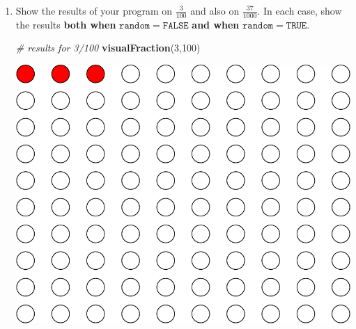 \documentclass[9pt,letter]{article}
\newenvironment{Shaded}{\begin{snugshade}}{\end{snugshade}}
\newcommand{\KeywordTok}[1]{\textcolor[rgb]{0.13,0.29,0.53}{\textbf{#1}}}
\newcommand{\DataTypeTok}[1]{\textcolor[rgb]{0.13,0.29,0.53}{#1}}
\newcommand{\DecValTok}[1]{\textcolor[rgb]{0.00,0.00,0.81}{#1}}
\newcommand{\StringTok}[1]{\textcolor[rgb]{0.31,0.60,0.02}{#1}}
\newcommand{\CommentTok}[1]{\textcolor[rgb]{0.56,0.35,0.01}{\textit{#1}}}
\newcommand{\ControlFlowTok}[1]{\textcolor[rgb]{0.13,0.29,0.53}{\textbf{#1}}}
\newcommand{\OperatorTok}[1]{\textcolor[rgb]{0.81,0.36,0.00}{\textbf{#1}}}
\newcommand{\NormalTok}[1]{#1}
\begin{document}
\begin{enumerate}
\begin{Shaded}
\end{Shaded}
\item
  Show the results of your program on \(\frac{3}{100}\) and also on
  \(\frac{37}{1000}\). In each case, show the results
  \textbf{both when } \(\mathtt{random=FALSE}\) \textbf{and when}
  \(\mathtt{random=TRUE}\).

\begin{Shaded}
\begin{Highlighting}[]
\CommentTok{# results for 3/100}
\KeywordTok{visualFraction}\NormalTok{(}\DecValTok{3}\NormalTok{,}\DecValTok{100}\NormalTok{)}
\end{Highlighting}
\end{Shaded}

  \includegraphics{a2_solutions_files/figure-latex/unnamed-chunk-3-1.pdf}


\end{enumerate}
\end{document}

